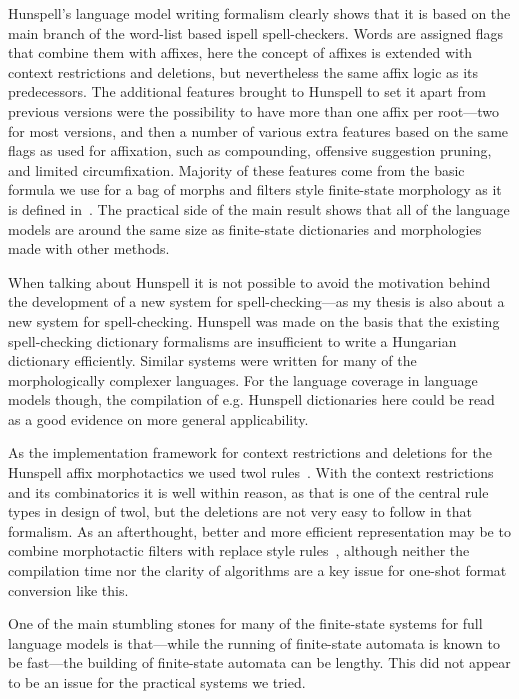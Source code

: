 \documentclass[officiallayout,draft]{unihelcompling}
\begin{document}
Hunspell's language model writing formalism clearly shows that it is based on
the main branch of the word-list based ispell spell-checkers. Words are
assigned flags that combine them with affixes, here the concept of affixes is
extended with context restrictions and deletions, but nevertheless the same
affix logic as its predecessors. The additional features brought to Hunspell to
set it apart from previous versions were the possibility to have more than one
affix per root---two for most versions, and then a number of various extra
features based on the same flags as used for affixation, such as compounding,
offensive suggestion pruning, and limited circumfixation.  Majority of these
features come from the basic formula we use for a bag of morphs and filters
style finite-state morphology as it is defined in~\citet{linden2009hfst}. The
practical side of the main result shows that all of the language models are
around the same size as finite-state dictionaries and morphologies made with
other methods.

When talking about Hunspell it is not possible to avoid the motivation behind
the development of a new system for spell-checking---as my thesis is also about
a new system for spell-checking. Hunspell was made on the basis that the
existing spell-checking dictionary formalisms are insufficient to write a
Hungarian dictionary efficiently. Similar systems were written for many of the
morphologically complexer languages. For the language coverage in language
models though, the compilation of e.g. Hunspell dictionaries here could be
read as a good evidence on more general applicability.

As the implementation framework for context restrictions and deletions for the
Hunspell affix morphotactics we used twol rules~\citep{karttunen1992two}. With
the context restrictions and its combinatorics it is well within reason, as
that is one of the central rule types in design of twol, but the deletions are
not very easy to follow in that formalism. As an afterthought, better and more
efficient representation may be to combine morphotactic filters with replace
style rules~\citep{karttunen1995replace}, although neither the compilation time
nor the clarity of algorithms are a key issue for one-shot format conversion
like this.

One of the main stumbling stones for many of the finite-state systems for full
language models is that---while the running of finite-state automata is known
to be fast---the building of finite-state automata can be lengthy. This did
not appear to be an issue for the practical systems we tried.
\end{document}
